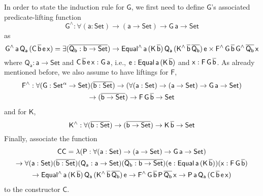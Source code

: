 \documentclass[9pt]{entcs} \usepackage{entcsmacro}
\begin{document}
In order to state the induction rule for $\mathsf{G}$,
we first need to define $\mathsf{G}$'s associated predicate-lifting function 
\[
\mathsf{G^{\wedge} : \forall (a : Set) \to (a \to Set) \to G\,a \to Set}
\]
as
\[
\mathsf{G^{\wedge}\,a\,Q_a\,(C\,\overline{b}\,e\,x)
= \exists (\overline{Q_b : b \to Set})
\to Equal^{\wedge}\,a\,(K\,\overline{b})\,Q_a\,(K^{\wedge}\,\overline{b}\,\overline{Q_b})\,e
\times F^{\wedge}\,G\,\overline{b}\,G^{\wedge}\,{\overline{Q_b}}\,x}
\]
where $\mathsf{Q_a : a \to Set}$
and $\mathsf{C\,\overline{b}\,e\,x : G\,a}$,
i.e., $\mathsf{e : Equal\,a\,(K\,\overline{b})}$ and $\mathsf{x : F\,G\,\overline{b}}$.
As already mentioned before, we also assume to have liftings for $\mathsf{F}$,
\begin{multline*}
\mathsf{F^{\wedge} : \forall (G : Set^{\alpha} \to Set) (\overline{b : Set})
\to (\forall (a : Set) \to (a \to Set) \to G\,a \to Set)} \\
\mathsf{\to (\overline{b \to Set})
\to F\,G\,\overline{b} \to Set}
\end{multline*}
and for  $\mathsf{K}$,
\[
\mathsf{K^{\wedge} : \forall (\overline{b : Set}) \to (\overline{b \to Set}) \to K\,\overline{b} \to Set}
\]
Finally, associate the function
\begin{multline*}
\mathsf{CC = \lambda (P : \forall (a : Set) \to (a \to Set) \to G\,a \to Set)} \\
\mathsf{\to \forall (a : Set) (\overline{b : Set}) (Q_a : a \to Set) (\overline{Q_b : b \to Set}) (e : Equal\,a\,(K\,\overline{b})) (x : F\,G\,\overline{b})} \\
\mathsf{\to Equal^{\wedge}\,a\,(K\,\overline{b})\,Q_a\,(K^{\wedge}\,\overline{b}\,\overline{Q_b})\,e
	\to F^{\wedge}\,G\,\overline{b}\,P\,\overline{Q_b}\,x
	\to P\,a\,Q_a\,(C\,\overline{b}\,e\,x)}
\end{multline*}
to the constructor $\mathsf{C}$.
\end{document}
